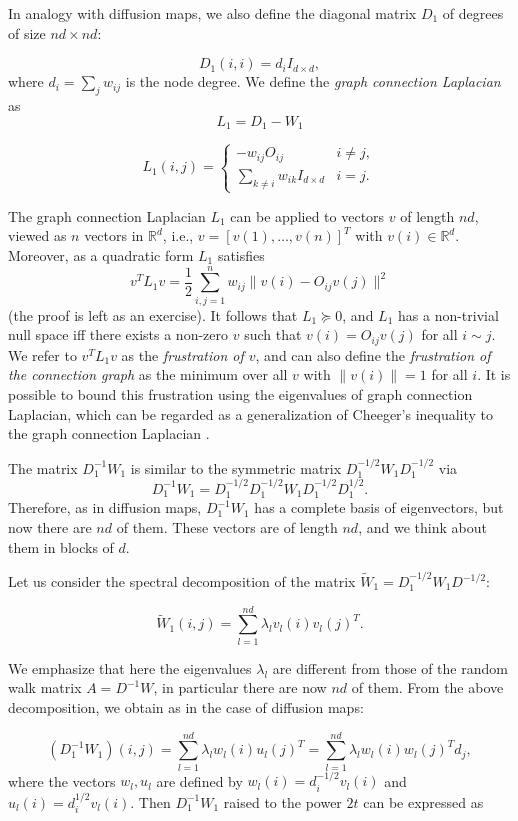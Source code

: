 In analogy with diffusion maps, we also define the diagonal matrix $D_1$ of degrees of size $nd \times nd$:

\[D_1(i,i) = d_i I_{d \times d},\]
where $d_i = \sum_j w_{ij}$ is the node degree. We define the {\em graph connection Laplacian} as
$$L_1 = D_1 - W_1$$ \vfill

$$L_1(i,j) = \left\{\begin{array}{cc}
                    -w_{ij}O_{ij} & i\neq j, \\
                    \sum_{k\neq i} w_{ik}I_{d\times d} & i=j.
                  \end{array}\right. $$ 

The graph connection Laplacian $L_1$ can be applied to vectors $v$ of length $nd$, viewed as $n$ vectors in $\mathbb{R}^d$, i.e., $v = [v(1),\ldots,v(n)]^T$ with $v(i) \in \mathbb{R}^d$. Moreover, as a quadratic form $L_1$ satisfies 
$$v^T L_1 v = \frac{1}{2} \sum_{i,j=1}^n w_{ij} \|v(i) - O_{ij} v(j)\|^2$$
(the proof is left as an exercise). It follows that $L_1 \succeq 0$, and $L_1$ has a non-trivial null space iff there exists a non-zero $v$ such that $v(i) = O_{ij}v(j)$ for all $i\sim j$. We refer to $v^T L_1 v$ as the {\em frustration of $v$}, and can also define the {\em frustration of the connection graph} as the minimum over all $v$ with $\|v(i)\|=1$ for all $i$. It is possible to bound this frustration using the eigenvalues of graph connection Laplacian, which can be regarded as a generalization of Cheeger's inequality to the graph connection Laplacian \cite{Bandeira_Singer_Spielman_OdCheeger}.

The matrix $D_1^{-1}W_1$ is similar to the symmetric matrix $D_1^{-1/2}W_1D_1^{-1/2}$ via
\[D_1^{-1}W_1 = D_1^{-1/2}D_1^{-1/2}W_1D_1^{-1/2}D_1^{1/2}.\]
Therefore, as in diffusion maps, $D_1^{-1}W_1$ has a complete basis of eigenvectors, but now there are $nd$ of them. These vectors are of length $nd$, and we think about them in blocks of $d$. 

 Let us consider the spectral decomposition of the matrix $\tilde{W}_1=D_1^{-1/2}W_1D^{-1/2}$:

\[\tilde{W}_1(i,j) = \sum \limits_{l=1}^{nd} \lambda_lv_l(i)v_l(j)^T. \]

We emphasize that here the eigenvalues $\lambda_l$ are different from those of the random walk matrix $A = D^{-1}W$, in particular there are now $nd$ of them. From the above decomposition, we obtain as in the case of diffusion maps:

\[\left( D_1^{-1}W_1\right)(i,j) = \sum \limits_{l=1}^{nd} \lambda_lw_l(i)u_l(j)^T = \sum \limits_{l=1}^{nd} \lambda_lw_l(i)w_l(j)^Td_j, \]
where the vectors $w_l, u_l$ are defined by $w_l(i) = d_i^{-1/2}v_l(i)$ and $u_l(i) = d_i^{1/2}v_l(i)$. Then $D_1^{-1}W_1$ raised to the power $2t$ can be expressed as

